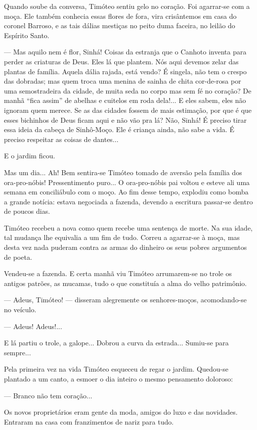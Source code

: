 Quando soube da conversa, Timóteo sentiu gelo no coração. Foi agarrar-se
com a moça. Ele também conhecia essas flores de fora, vira crisântemos
em casa do coronel Barroso, e as tais dálias mestiças no peito duma
faceira, no leilão do Espírito Santo.

--- Mas aquilo nem é flor, Sinhá! Coisas da estranja que o Canhoto
inventa para perder as criaturas de Deus. Eles lá que plantem. Nós aqui
devemos zelar das plantas de família. Aquela dália rajada, está vendo? É
singela, não tem o crespo das dobradas; mas quem troca uma menina de
sainha de chita cor-de-rosa por uma semostradeira da cidade, de muita
seda no corpo mas sem fé no coração? De manhã ``fica assim'' de abelhas
e cuitelos em roda dela!... E eles sabem, eles não ignoram quem merece.
Se as das cidades fossem de mais estimação, por que é que esses
bichinhos de Deus ficam aqui e não vão pra lá? Não, Sinhá! É preciso
tirar essa ideia da cabeça de Sinhô-Moço. Ele é criança ainda, não sabe
a vida. É preciso respeitar as coisas de dantes...

E o jardim ficou.

Mas um dia... Ah! Bem sentira-se Timóteo tomado de aversão pela família
dos ora-pro-nóbis! Pressentimento puro... O ora-pro-nóbis pai voltou e
esteve ali uma semana em conciliábulo com o moço. Ao fim desse tempo,
explodiu como bomba a grande notícia: estava negociada a fazenda,
devendo a escritura passar-se dentro de poucos dias.

Timóteo recebeu a nova como quem recebe uma sentença de morte. Na sua
idade, tal mudança lhe equivalia a um fim de tudo. Correu a agarrar-se à
moça, mas desta vez nada puderam contra as armas do dinheiro os seus
pobres argumentos de poeta.

Vendeu-se a fazenda. E certa manhã viu Timóteo arrumarem-se no trole os
antigos patrões, as mucamas, tudo o que constituía a alma do velho
patrimônio.

--- Adeus, Timóteo! --- disseram alegremente os senhores-moços,
acomodando-se no veículo.

--- Adeus! Adeus!...

E lá partiu o trole, a galope... Dobrou a curva da estrada... Sumiu-se
para sempre...

Pela primeira vez na vida Timóteo esqueceu de regar o jardim. Quedou-se
plantado a um canto, a esmoer o dia inteiro o mesmo pensamento doloroso:

--- Branco não tem coração...

Os novos proprietários eram gente da moda, amigos do luxo e das
novidades. Entraram na casa com franzimentos de nariz para tudo.

